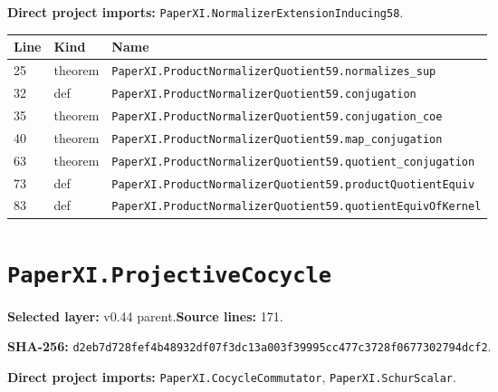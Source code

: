 \documentclass[10pt,oneside]{book}
\begin{document}

\textbf{Direct project imports:} \nolinkurl{PaperXI.NormalizerExtensionInducing58}.

\begin{longtable}{@{}p{}p{}p{}@{}}\toprule Line&Kind&Name\\\midrule\endhead

25&theorem&\nolinkurl{PaperXI.ProductNormalizerQuotient59.normalizes_sup}\\

32&def&\nolinkurl{PaperXI.ProductNormalizerQuotient59.conjugation}\\

35&theorem&\nolinkurl{PaperXI.ProductNormalizerQuotient59.conjugation_coe}\\

40&theorem&\nolinkurl{PaperXI.ProductNormalizerQuotient59.map_conjugation}\\

63&theorem&\nolinkurl{PaperXI.ProductNormalizerQuotient59.quotient_conjugation}\\

73&def&\nolinkurl{PaperXI.ProductNormalizerQuotient59.productQuotientEquiv}\\

83&def&\nolinkurl{PaperXI.ProductNormalizerQuotient59.quotientEquivOfKernel}\\

\bottomrule\end{longtable}

\section{\texorpdfstring{\nolinkurl{PaperXI.ProjectiveCocycle}}{PaperXI.ProjectiveCocycle}}\label{module:PaperXI.ProjectiveCocycle}

\textbf{Selected layer:} v0.44 parent.\quad\textbf{Source lines:} 171.\par\textbf{SHA-256:} {\scriptsize\nolinkurl{d2eb7d728fef4b48932df07f3dc13a003f39995cc477c3728f0677302794dcf2}}.


\textbf{Direct project imports:} \nolinkurl{PaperXI.CocycleCommutator}, \nolinkurl{PaperXI.SchurScalar}.
\end{document}
